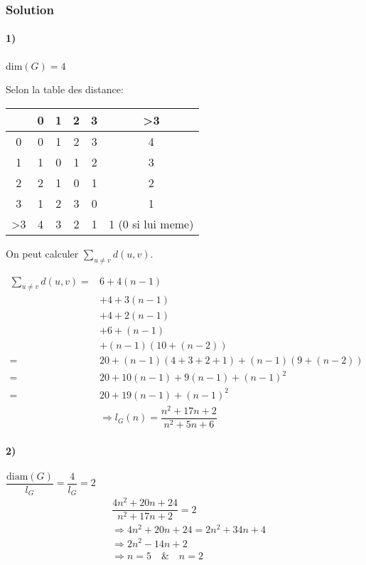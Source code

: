 \subsubsection*{Solution}
\paragraph{1)} dim$(G) = 4$

Selon la table des distance:

\begin{tabular}{c|ccccc}
    &0&1&2&3& >3 \\
    \hline
    0 & 0& 1& 2& 3& 4\\
    1 & 1& 0&1& 2& 3\\
    2 & 2& 1& 0& 1&2\\
    3 & 1& 2& 3& 0&1\\
    >3 & 4& 3& 2& 1& 1 (0 si lui meme)\\
\end{tabular}

On peut calculer $\sum_{u\neq v} d(u,v)$.

\begin{align*}
    \sum_{u\neq v} d(u,v) =& 6 + 4(n-1)\\
    &+ 4 + 3(n-1)\\
    &+4+2(n-1)\\
    &+6+(n-1)\\
    &+(n-1)(10 + (n-2))\\
    =& 20 + (n-1)(4+3+2+1) + (n-1)(9 + (n-2))\\
    =& 20 + 10(n-1) + 9(n-1) + (n-1)^2\\
    =& 20 + 19(n-1) + (n-1)^2\\
    & \Rightarrow l_G (n) = \dfrac{n^2 + 17n + 2}{n^2 + 5n + 6}
\end{align*}

\paragraph{2)} $\dfrac{\text{diam}(G)}{l_G} = \dfrac{4}{l_G} =2$
\begin{align*}
    & \dfrac{4n^2 + 20n + 24}{n^2 + 17n + 2} = 2\\
    & \Rightarrow 4n^2 + 20n + 24 = 2n^2 + 34n + 4\\
    & \Rightarrow 2n^2 - 14n + 2\\
    & \Rightarrow n = 5\hspace{1em}\&\hspace{1em} n = 2\\
\end{align*}

